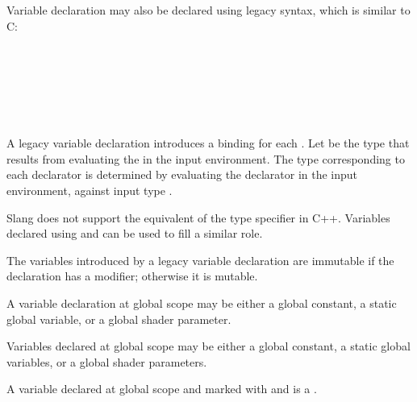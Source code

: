 \begin{Legacy}


Variable declaration may also be declared using legacy syntax, which is similar to C:

    \begin{Syntax}
         \\
             \\

         \\
              \SynStar \code{;} \\

         \\
              \SynOpt
    \end{Syntax}

A legacy variable declaration introduces a binding for each .
Let  be the type that results from evaluating the  in the input environment.
The type  corresponding to each declarator is determined by evaluating the declarator in the input environment, against input type .

\begin{Note}
Slang does not support the equivalent of the  type specifier in C++.
Variables declared using  and  can be used to fill a similar role.
\end{Note}

The variables introduced by a legacy variable declaration are immutable if the declaration has a  modifier; otherwise it is mutable.

\end{Legacy}


A variable declaration at global scope may be either a global constant, a static global variable, or a global shader parameter.

Variables declared at global scope may be either a global constant, a static global variables, or a global shader parameters.


A variable declared at global scope and marked with  and  is a .

